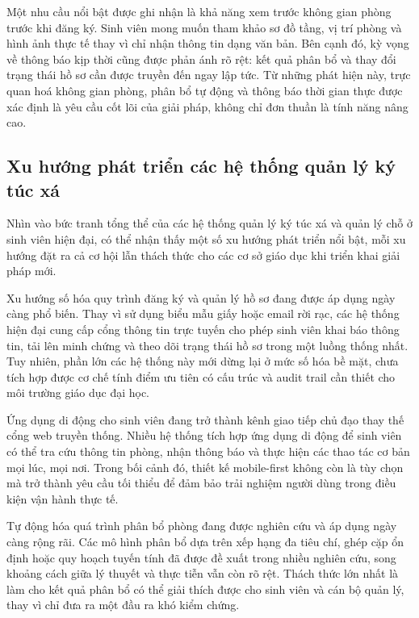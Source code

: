 ﻿\documentclass[a4paper,12pt,openany,oneside]{report}
\begin{document}
Một nhu cầu nổi bật được ghi nhận là khả năng xem trước không gian phòng trước
khi đăng ký. Sinh viên mong muốn tham khảo sơ đồ tầng, vị trí phòng và hình
ảnh thực tế thay vì chỉ nhận thông tin dạng văn bản. Bên cạnh đó, kỳ vọng về
thông báo kịp thời cũng được phản ánh rõ rệt: kết quả phân bổ và thay đổi
trạng thái hồ sơ cần được truyền đến ngay lập tức. Từ những phát hiện này,
trực quan hoá không gian phòng, phân bổ tự động và thông báo thời gian thực
được xác định là yêu cầu cốt lõi của giải pháp, không chỉ đơn thuần là tính
năng nâng cao.

\subsection{Xu hướng phát triển các hệ thống quản lý ký túc xá}

Nhìn vào bức tranh tổng thể của các hệ thống quản lý ký túc xá và quản lý chỗ
ở sinh viên hiện đại, có thể nhận thấy một số xu hướng phát triển nổi bật, mỗi
xu hướng đặt ra cả cơ hội lẫn thách thức cho các cơ sở giáo dục khi triển khai
giải pháp mới.

Xu hướng số hóa quy trình đăng ký và quản lý hồ sơ đang được áp dụng ngày
càng phổ biến. Thay vì sử dụng biểu mẫu giấy hoặc email rời rạc, các hệ thống
hiện đại cung cấp cổng thông tin trực tuyến cho phép sinh viên khai báo thông
tin, tải lên minh chứng và theo dõi trạng thái hồ sơ trong một luồng thống
nhất. Tuy nhiên, phần lớn các hệ thống này mới dừng lại ở mức số hóa bề mặt,
chưa tích hợp được cơ chế tính điểm ưu tiên có cấu trúc và audit trail cần
thiết cho môi trường giáo dục đại học.

Ứng dụng di động cho sinh viên đang trở thành kênh giao tiếp chủ đạo thay thế
cổng web truyền thống. Nhiều hệ thống tích hợp ứng dụng di động để sinh viên
có thể tra cứu thông tin phòng, nhận thông báo và thực hiện các thao tác cơ
bản mọi lúc, mọi nơi. Trong bối cảnh đó, thiết kế mobile-first không còn là
tùy chọn mà trở thành yêu cầu tối thiểu để đảm bảo trải nghiệm người dùng
trong điều kiện vận hành thực tế.

Tự động hóa quá trình phân bổ phòng đang được nghiên cứu và áp dụng ngày càng
rộng rãi. Các mô hình phân bổ dựa trên xếp hạng đa tiêu chí, ghép cặp ổn định
hoặc quy hoạch tuyến tính đã được đề xuất trong nhiều nghiên cứu, song khoảng
cách giữa lý thuyết và thực tiễn vẫn còn rõ rệt. Thách thức lớn nhất là làm
cho kết quả phân bổ có thể giải thích được cho sinh viên và cán bộ quản lý,
thay vì chỉ đưa ra một đầu ra khó kiểm chứng.
\end{document}
